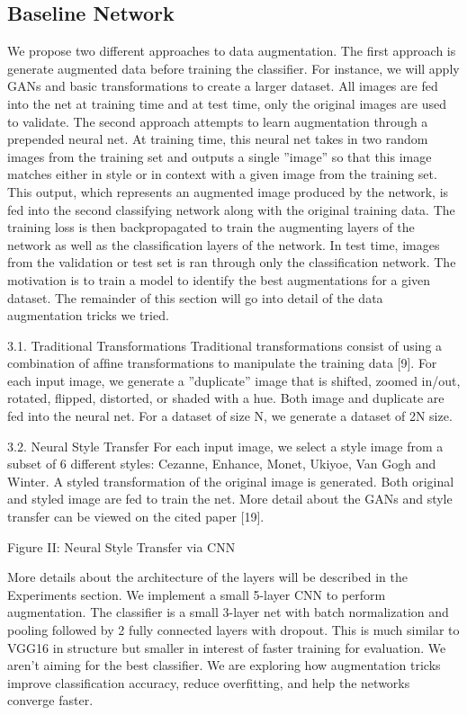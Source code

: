 \documentclass[a4paper,11pt]{article}
\begin{document}
\subsection{Baseline Network}
We propose two different approaches to data augmentation. The ﬁrst approach is generate augmented data before training the classiﬁer. For instance, we will apply GANs and basic transformations to create a larger dataset. All images are fed into the net at training time and at test time, only the original images are used to validate. The second approach attempts to learn augmentation through a prepended neural net. At training time, this neural net takes in two random images from the training set and outputs a single ”image” so that this image matches either in style or in context with a given image from the training set. This output, which represents an augmented image produced by the network, is fed into the second classifying network along with the original training data. The training loss is then backpropagated to train the augmenting layers of the network as well as the classiﬁcation layers of the network. In test time, images from the validation or test set is ran through only the classiﬁcation network. The motivation is to train a model to identify the best augmentations for a given dataset. The remainder of this section will go into detail of the data augmentation tricks we tried.

3.1. Traditional Transformations
Traditional transformations consist of using a combination of afﬁne transformations to manipulate the training data [9]. For each input image, we generate a ”duplicate” image that is shifted, zoomed in/out, rotated, ﬂipped, distorted, or shaded with a hue. Both image and duplicate are fed into the neural net. For a dataset of size N, we generate a dataset of 2N size.

3.2. Neural Style Transfer
For each input image, we select a style image from a subset of 6 different styles: Cezanne, Enhance, Monet, Ukiyoe, Van Gogh and Winter. A styled transformation of the original image is generated. Both original and styled image are fed to train the net. More detail about the GANs and style transfer can be viewed on the cited paper [19].

Figure II: Neural Style Transfer via CNN

More details about the architecture of the layers will be described in the Experiments section. We implement a small 5-layer CNN to perform augmentation. The classiﬁer is a small 3-layer net with batch normalization and pooling followed by 2 fully connected layers with dropout. This is much similar to VGG16 in structure but smaller in interest of faster training for evaluation. We aren’t aiming for the best classiﬁer. We are exploring how augmentation tricks improve classiﬁcation accuracy, reduce overﬁtting, and help the networks converge faster.
\end{document}
